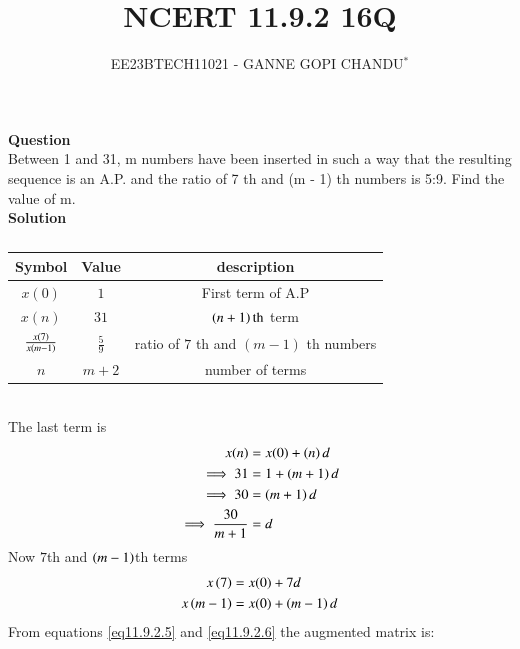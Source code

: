 \documentclass[journal,12pt,onecolumn]{IEEEtran}
\theoremstyle{remark}
\begin{document}

\vspace{3cm}
\title{NCERT 11.9.2 16Q}
\author{EE23BTECH11021 - GANNE GOPI CHANDU$^{*}$%
}
\maketitle
\bigskip
\renewcommand{\thefigure}{\theenumi}
\renewcommand{\thetable}{\theenumi}

\textbf{Question}\\
Between 1 and 31, m numbers have been inserted in such a way that the resulting sequence is an A.P. and 
the ratio of 7
th and (m - 1)
th numbers is 5:9. Find the value of m.\\
\textbf{Solution}\\
\begin{table}[!h]
\begin{center}
\renewcommand\thetable{1}
\begin{tabular}{ |c|c|c| } 
  \hline
    Symbol & Value & description \\ 
  \hline
  $x(0)$ & $1$ & First term of A.P  \\ 
  \hline
  $x(n)$ & $31$ & $\left(n+1\right)\text{th}$ term \\
  \hline
  $\frac{x\left(7\right)}{x\left(m-1\right)}$ & $\frac{5}{9}$ & ratio of $7$ th  and $(m-1)$ th numbers\\ 
  \hline
  $n$ & $m+2$ & number of terms \\
  \hline
\end{tabular}
\end{center}
\caption{}
\end{table}\\
The last term is
\begin{align}
x(n)&=x(0)+\left(n\right)d\\
\implies31 &= 1 + \left(m + 1\right)d \\
\implies30 &= \left(m + 1\right)d \\
\implies\frac{30}{m + 1} &= d \label{eq11.9.2.4}
\end{align}
Now $7$th and $\left(m-1\right)$th terms
\begin{align}
x\left(7\right) &= x(0) + 7d\label{eq11.9.2.5}\\
x\left(m-1\right) &= x(0) + \left(m-1\right)d\label{eq11.9.2.6}
\end{align}
From  equations \eqref{eq11.9.2.5} and \eqref{eq11.9.2.6} the augmented matrix is:\\
\end{document}
